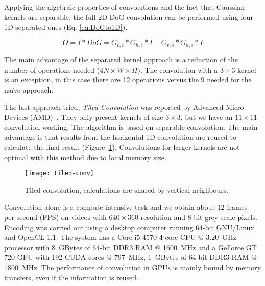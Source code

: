 Applying the algebraic properties of convolutions and the fact that Gaussian kernels are separable, the full 2D DoG convolution can be performed using four 1D separated ones (Eq. \ref{eq:DoGto1D}).

\begin{equation}
O = I \ast DoG = G_{v,c} \ast G_{h,c} \ast I - G_{v,s} \ast G_{h,s} \ast I 
\label{eq:DoGto1D}
\end{equation}

The main advantage of the separated kernel approach is a reduction of the number of operations needed ($4N\times W \times H$). The convolution with a $3\times 3$ kernel is an exception, in this case there are 12 operations versus the 9 needed for the naïve approach.


The last approach tried, \emph{Tiled Convolution} was reported by Advanced Micro Devices (AMD)~\cite{tiled-convolution}. They only present kernels of size $3\times3$, but we have an $11\times11$ convolution working. The algorithm is based on separable convolution. The main advantage is that results from the horizontal 1D convolution are reused to calculate the final result (Figure~\ref{fig:c2s:tiled-conv}). Convolutions for larger kernels are not optimal with this method due to local memory size.

\begin{figure}[h]
  \begin{center}
    \texttt{[image: tiled-conv]}
    \caption{Tiled convolution, calculations are shared by vertical neighbours.}
    \label{fig:c2s:tiled-conv}
  \end{center}
\end{figure}

Convolution alone is a compute intensive task and we obtain about 12 frames-per-second (FPS) on videos with $640\times360$ resolution and 8-bit grey-scale pixels. Encoding was carried out using a desktop computer running 64-bit GNU/Linux and OpenCL 1.1. The system has a Core i5-4570 4-core CPU @ 3.20~GHz processor with 8~GBytes of 64-bit DDR3 RAM @ 1600~MHz and a GeForce GT 720 GPU with 192 CUDA cores @ 797~MHz, 1~GBytes of 64-bit DDR3 RAM @ 1800~MHz. The performance of convolution in GPUs is mainly bound by memory transfers, even if the information is reused. %

